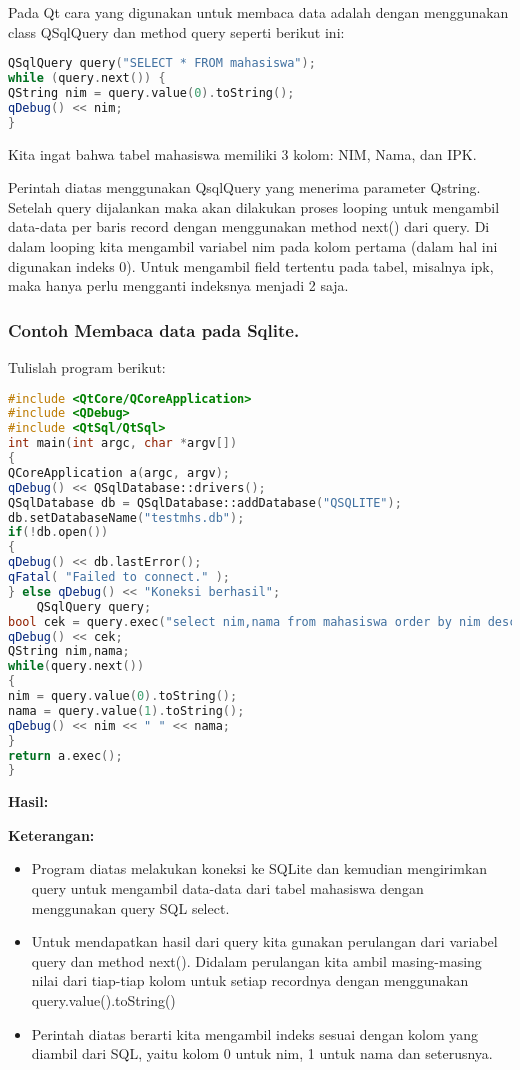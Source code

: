Pada Qt cara yang digunakan untuk membaca data adalah dengan menggunakan
class QSqlQuery dan method query seperti berikut ini:

\begin{lstlisting}[language=c++, numbers=none]
QSqlQuery query("SELECT * FROM mahasiswa");
while (query.next()) {
QString nim = query.value(0).toString();
qDebug() << nim;
}
\end{lstlisting}

Kita ingat bahwa tabel mahasiswa memiliki 3 kolom: NIM, Nama, dan IPK.

Perintah diatas menggunakan QsqlQuery yang menerima parameter Qstring.
Setelah query dijalankan maka akan dilakukan proses looping untuk
mengambil data-data per baris record dengan menggunakan method next()
dari query. Di dalam looping kita mengambil variabel nim pada kolom
pertama (dalam hal ini digunakan indeks 0). Untuk mengambil field
tertentu pada tabel, misalnya ipk, maka hanya perlu mengganti indeksnya
menjadi 2 saja.

\subsubsection*{Contoh  Membaca data pada Sqlite.}

Tulislah program berikut:

\begin{lstlisting}[language=c++, caption= Membaca data pada Sqlite]
#include <QtCore/QCoreApplication>
#include <QDebug>
#include <QtSql/QtSql>
int main(int argc, char *argv[])
{
QCoreApplication a(argc, argv);
qDebug() << QSqlDatabase::drivers();
QSqlDatabase db = QSqlDatabase::addDatabase("QSQLITE");
db.setDatabaseName("testmhs.db");
if(!db.open())
{
qDebug() << db.lastError();
qFatal( "Failed to connect." );
} else qDebug() << "Koneksi berhasil";
    QSqlQuery query;
bool cek = query.exec("select nim,nama from mahasiswa order by nim desc");
qDebug() << cek;
QString nim,nama;
while(query.next())
{
nim = query.value(0).toString();
nama = query.value(1).toString();
qDebug() << nim << " " << nama;
}
return a.exec();
}
\end{lstlisting}

\textbf{Hasil:}

\textbf{Keterangan:}

\begin{itemize}

\item
  Program diatas melakukan koneksi ke SQLite dan kemudian mengirimkan
  query untuk mengambil data-data dari tabel mahasiswa dengan
  menggunakan query SQL select.
\item
  Untuk mendapatkan hasil dari query kita gunakan perulangan dari
  variabel query dan method next(). Didalam perulangan kita ambil
  masing-masing nilai dari tiap-tiap kolom untuk setiap recordnya dengan
  menggunakan query.value().toString()
\item
  Perintah diatas berarti kita mengambil indeks sesuai dengan kolom yang
  diambil dari SQL, yaitu kolom 0 untuk nim, 1 untuk nama dan
  seterusnya.
\end{itemize}

